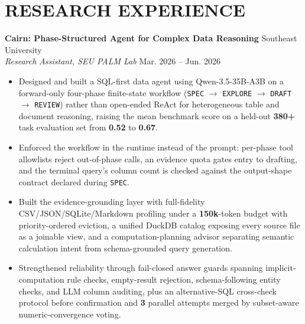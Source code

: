 \documentclass[10pt, a4paper]{article}
\newcommand{\entry}[4]{
  \vspace{0.2em}
  {\large\textbf{\color{PrimaryText}#1}} \hfill {\color{MutedText}#3} \\
  \textit{\color{PrimaryText}#2} \hfill {\small\color{MutedText}#4} \par
}
\begin{document}
\section*{RESEARCH EXPERIENCE}
\entry{Cairn: Phase-Structured Agent for Complex Data Reasoning}{Research Assistant, SEU PALM Lab}{Southeast University}{Mar. 2026 -- Jun. 2026}
\begin{itemize}
    \item Designed and built a SQL-first data agent using Qwen-3.5-35B-A3B on a forward-only four-phase finite-state workflow (\texttt{SPEC} $\rightarrow$ \texttt{EXPLORE} $\rightarrow$ \texttt{DRAFT} $\rightarrow$ \texttt{REVIEW}) rather than open-ended ReAct for heterogeneous table and document reasoning, raising the mean benchmark score on a held-out \textbf{380+} task evaluation set from \textbf{0.52} to \textbf{0.67}.
    \item Enforced the workflow in the runtime instead of the prompt: per-phase tool allowlists reject out-of-phase calls, an evidence quota gates entry to drafting, and the terminal query's column count is checked against the output-shape contract declared during \texttt{SPEC}.
    \item Built the evidence-grounding layer with full-fidelity CSV/JSON/SQLite/Markdown profiling under a \textbf{150k}-token budget with priority-ordered eviction, a unified DuckDB catalog exposing every source file as a joinable view, and a computation-planning advisor separating semantic calculation intent from schema-grounded query generation.
    \item Strengthened reliability through fail-closed answer guards spanning implicit-computation rule checks, empty-result rejection, schema-following entity checks, and LLM column auditing, plus an alternative-SQL cross-check protocol before confirmation and \textbf{3} parallel attempts merged by subset-aware numeric-convergence voting.
\end{itemize}

\vspace{0.3em}
\end{document}
